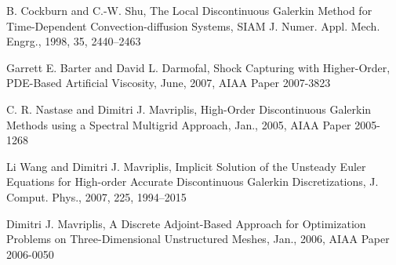 \documentclass{report}
\begin{document}
\begin{thebibliography}{}


{B. Cockburn and C.-W. Shu},
{The Local Discontinuous Galerkin Method for Time-Dependent
Convection-diffusion Systems},
{SIAM J. Numer. Appl. Mech. Engrg.},
{1998},
{35},
{2440--2463}


{Garrett E. Barter and David L. Darmofal},
{Shock Capturing with Higher-Order, PDE-Based Artificial Viscosity},
{June},
{2007},
{{AIAA} Paper 2007-3823}


{C. R. Nastase and Dimitri J. Mavriplis},
{High-Order Discontinuous Galerkin Methods using a Spectral Multigrid Approach},
{Jan.},
{2005},
{{AIAA} Paper 2005-1268}



{Li Wang and Dimitri J. Mavriplis},
{Implicit Solution of the Unsteady {E}uler Equations for High-order
Accurate Discontinuous {G}alerkin Discretizations},
{J. Comput. Phys.},
{2007},
{225},
{1994--2015}



{Dimitri J. Mavriplis},
{A Discrete Adjoint-Based Approach for Optimization Problems on
Three-Dimensional Unstructured Meshes},
{{J}an.},
{2006},
{{AIAA} Paper 2006-0050}

\end{thebibliography}
\end{document}
